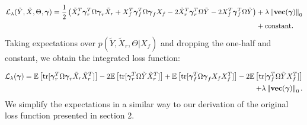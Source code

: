 \documentclass[ba]{imsart}
\newcommand\norm[1]{\left\lVert#1\right\rVert}
\begin{document}
{\small
\begin{equation}\label{modnew1}
	\begin{split}
		\mathcal{L}_{\lambda}(\tilde{Y},\tilde{X}, \Theta, \boldsymbol{\gamma}) = \frac{1}{2}\left(\tilde{X}_{r}^{T}\boldsymbol{\gamma}_{r}^{T}  \Omega \boldsymbol{\gamma}_{r} \tilde{X}_{r} + X_{f}^{T}\boldsymbol{\gamma}_{f}^{T}  \Omega \boldsymbol{\gamma}_{f} X_{f} - 2\tilde{X}_{r}^{T}\boldsymbol{\gamma}_{r}^{T} \Omega \tilde{Y} - 2 X_{f}^{T}\boldsymbol{\gamma}_{f}^{T} \Omega \tilde{Y}\right) &+ \lambda \norm{\text{{\bf vec}}(\boldsymbol{\gamma})}_{0}
		\\
		 &+ \text{constant}. 
		\end{split}
\end{equation}}Taking expectations over $p(\tilde{Y}, \tilde{X}_{r}, \Theta \vert X_{f})$ and dropping the one-half and constant, we obtain the integrated loss function:

{\small
\begin{equation}\label{modnew2}
	\begin{split}
				\mathcal{L}_{\lambda}(\boldsymbol{\gamma}) =
		\mathbb{E}\left[\text{tr}[\boldsymbol{\gamma}_{r}^{T}  \Omega \boldsymbol{\gamma}_{r} \tilde{X}_{r}\tilde{X}_{r}^{T}]\right]  - 2\mathbb{E}\left[\text{tr}[\boldsymbol{\gamma}_{r}^{T} \Omega \tilde{Y}\tilde{X}_{r}^{T}]\right] + \mathbb{E}\left[\text{tr}[\boldsymbol{\gamma}_{f}^{T}  \Omega \boldsymbol{\gamma}_{f} X_{f}X_{f}^{T}]\right] - 2\mathbb{E}\left[\text{tr}[\boldsymbol{\gamma}_{f}^{T} \Omega \tilde{Y}X_{f}^{T}]\right] 
		\\
		+ \lambda \norm{\text{{\bf vec}}(\boldsymbol{\gamma})}_{0}.  
		\end{split}
\end{equation}}We simplify the expectations in a similar way to our derivation of the original loss function presented in section 2.
\end{document}
